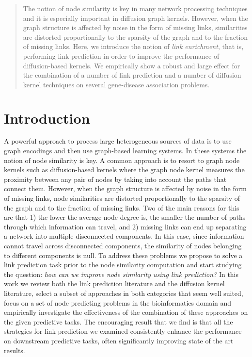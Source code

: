 
\begin{abstract}

The notion of node similarity is key in many network processing techniques and
it is especially important in diffusion graph kernels. However, when the graph
structure is affected by noise in the form of missing links, similarities are
distorted  proportionally to the sparsity of the graph and to the fraction of
missing links. Here, we introduce the notion of {\em link enrichment},
that is, performing link prediction in order to improve the performance of
diffusion-based kernels. We empirically show a robust and large effect for the
combination of a number of link prediction and a number of diffusion kernel
techniques on several gene-disease association problems.

\end{abstract}


\section{Introduction}

A powerful approach to process large heterogeneous sources of data is to use
graph encodings \cite{proceeding1} \cite{jour1} and then use graph-based
learning systems. In these systems the notion of node similarity is key. A
common approach is to resort to graph node kernels such as diffusion-based
kernels \cite{proceeding2} where the graph node kernel measures the proximity
between any pair of nodes by taking into account the paths that connect them.
However, when the graph structure is affected by noise in the form of missing
links, node similarities are distorted  proportionally to the sparsity of the
graph and to the fraction of missing links. Two of the main reasons for this
are that 1) the lower the average node degree is, the smaller the number of
paths through which information can travel, and 2) missing links can end up
separating a network into multiple disconnected components. In this case,
since  information cannot travel across disconnected components, the
similarity of nodes belonging to different components is null. To address
these problems we propose to solve a link prediction task prior to the node
similarity computation and start studying the question: {\em how can we
improve node similarity using link prediction?} In this work we review both
the link prediction literature and the diffusion kernel literature, select a
subset of approaches in both categories that seem well suited, focus on a set
of node predicting problems in the bioinformatics domain and empirically
investigate the effectiveness of the combination of these approaches on the given
predictive tasks. The encouraging result that we find is that all the
strategies for link prediction we examined consistently enhance the
performance on downstream predictive tasks, often significantly improving
state of the art results.
